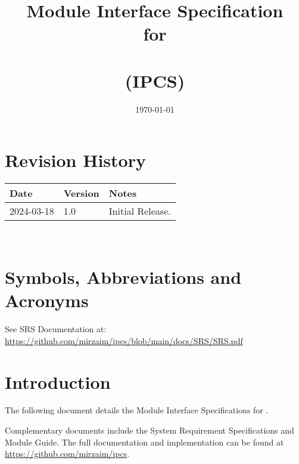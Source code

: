 \documentclass[12pt, titlepage]{article}
\begin{document}
\title{Module Interface Specification\\ for\\ \progname{}\\(IPCS)}

\author{\authname}

\date{\today}

\maketitle


\section{Revision History}

\begin{tabularx}{\textwidth}{p{3cm}p{2cm}X}
\toprule {\bf Date} & {\bf Version} & {\bf Notes}\\
\midrule
2024-03-18 & 1.0 & Initial Release.\\
\bottomrule
\end{tabularx}

~\newpage

\section{Symbols, Abbreviations and Acronyms}

See SRS Documentation at: \\
\url{https://github.com/mirzaim/ipcs/blob/main/docs/SRS/SRS.pdf}


\newpage

\tableofcontents

\newpage


\section{Introduction}

The following document details the Module Interface Specifications for
\progname{}.

Complementary documents include the System Requirement Specifications
and Module Guide.  The full documentation and implementation can be
found at \url{https://github.com/mirzaim/ipcs}. 
\end{document}
